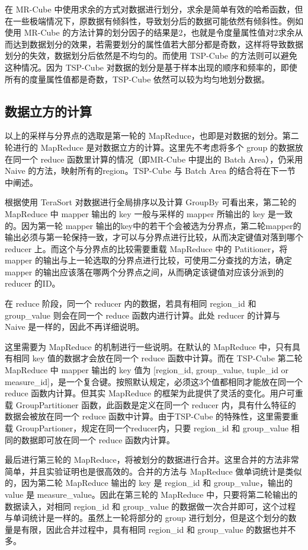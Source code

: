 在 MR-Cube 中使用求余的方式对数据进行划分，求余是简单有效的哈希函数，但在一些极端情况下，原数据有倾斜性，导致划分后的数据可能依然有倾斜性。例如使用 MR-Cube 的方法计算的划分因子的结果是2，也就是令度量属性值对2求余从而达到数据划分的效果，若需要划分的属性值若大部分都是奇数，这样将导致数据划分的失效，数据划分后依然是不均匀的。而使用 TSP-Cube 的方法则可以避免这种情况。因为 TSP-Cube 对数据的划分是基于样本出现的顺序和频率的，即使所有的度量属性值都是奇数，TSP-Cube 依然可以较为均匀地划分数据。


\subsection{数据立方的计算}

以上的采样与分界点的选取是第一轮的 MapReduce，也即是对数据的划分。第二轮进行的 MapReduce 是对数据立方的计算。这里先不考虑将多个 group 的数据放在同一个 reduce 函数里计算的情况（即MR-Cube 中提出的 Batch Area），仍采用 Naive 的方法，映射所有的region。TSP-Cube 与 Batch Area 的结合将在下一节中阐述。

根据使用 TeraSort 对数据进行全局排序以及计算 GroupBy 可看出来，第二轮的 MapReduce 中 mapper 输出的 key 一般与采样的 mapper 所输出的 key 是一致的。因为第一轮 mapper 输出的key中的若干个会被选为分界点，第二轮mapper的输出必须与第一轮保持一致，才可以与分界点进行比较，从而决定键值对落到哪个 reducer 上。而这个与分界点的比较需要重载 MapReduce 中的 Patitioner，将 mapper 的输出与上一轮选取的分界点进行比较，可使用二分查找的方法，确定 mapper 的输出应该落在哪两个分界点之间，从而确定该键值对应该分派到的reducer 的ID。

在 reduce 阶段，同一个 reducer 内的数据，若具有相同 region\_id 和 group\_value 则会在同一个 reduce 函数内进行计算。此处 reducer 的计算与 Naive 是一样的，因此不再详细说明。


这里需要为 MapReduce 的机制进行一些说明。在默认的 MapReduce 中，只有具有相同 key 值的数据才会放在同一个 reduce 函数中计算。而在 TSP-Cube 第二轮 MapReduce 中 mapper 输出的 key 值为 [region\_id, group\_value, tuple\_id or measure\_id]，是一个复合键。按照默认规定，必须这3个值都相同才能放在同一个 reduce 函数内计算。但其实 MapReduce 的框架为此提供了灵活的变化。用户可重载 GroupPartitioner 函数，此函数是定义在同一个 reducer 内，具有什么特征的数据会被放在同一个 reduce 函数中计算。由于TSP-Cube 的特殊性，这里需要重载 GroupPartioner，规定在同一个reducer内，只要 region\_id 和 group\_value 相同的数据即可放在同一个 reduce 函数内计算。

最后进行第三轮的 MapReduce，将被划分的数据进行合并。这里合并的方法非常简单，并且实验证明也是很高效的。合并的方法与 MapReduce 做单词统计是类似的，因为第二轮 MapReduce 输出的 key 是 region\_id 和 group\_value，输出的 value 是 measure\_value。因此在第三轮的 MapReduce 中，只要将第二轮输出的数据读入，对相同 region\_id 和 group\_value 的数据做一次合并即可，这个过程与单词统计是一样的。虽然上一轮将部分的 group 进行划分，但是这个划分的数量是有限，因此合并过程中，具有相同 region\_id 和 group\_value 的数据也并不多。


